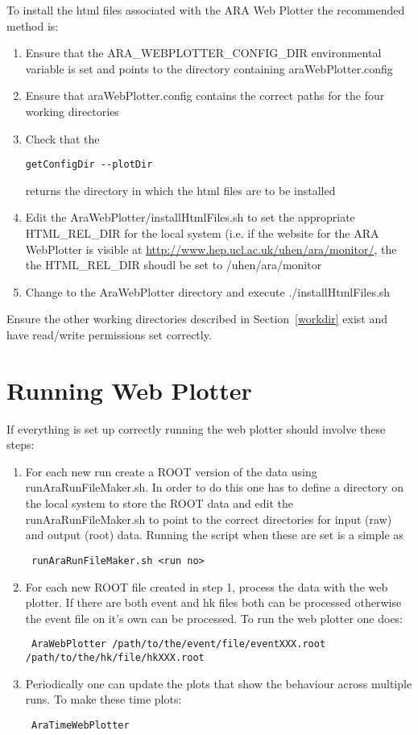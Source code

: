 \documentclass[letterpaper]{article}  %
\begin{document}
To install the html files associated with the ARA Web Plotter the recommended method is:
\begin{enumerate}
\item Ensure that the ARA\_WEBPLOTTER\_CONFIG\_DIR environmental variable is set and points to the directory containing araWebPlotter.config
\item Ensure that araWebPlotter.config contains the correct paths for the four working directories
\item Check that the \begin{verbatim}getConfigDir --plotDir\end{verbatim} returns the directory in which the html files are to be installed
\item Edit the AraWebPlotter/installHtmlFiles.sh to set the appropriate HTML\_REL\_DIR for the local system (i.e. if the website for the ARA WebPlotter is visible at \url{http://www.hep.ucl.ac.uk/uhen/ara/monitor/}, the the HTML\_REL\_DIR shoudl be set to /uhen/ara/monitor
\item Change to the AraWebPlotter directory and execute ./installHtmlFiles.sh
\end{enumerate}

Ensure the other working directories described in Section~\ref{workdir} exist and have read/write permissions set correctly.


\section{Running Web Plotter}
If everything is set up correctly running the web plotter should involve these steps:
\begin{enumerate}
\item For each new run create a ROOT version of the data using runAraRunFileMaker.sh. In order to do this one has to define a directory on the local system to store the ROOT data and edit the runAraRunFileMaker.sh to point to the correct directories for input (raw) and output (root) data. Running the script when these are set is a simple as \begin{verbatim} runAraRunFileMaker.sh <run no>\end{verbatim}
\item For each new ROOT file created in step 1, process the data with the web plotter. If there are both event and hk files both can be processed otherwise the event file on it's own can be processed. To run the web plotter one does: \begin{verbatim} AraWebPlotter /path/to/the/event/file/eventXXX.root /path/to/the/hk/file/hkXXX.root \end{verbatim}
\item Periodically one can update the plots that show the behaviour across multiple runs. To make these time plots: \begin{verbatim} AraTimeWebPlotter \end{verbatim}
\end{enumerate}
\end{document}
